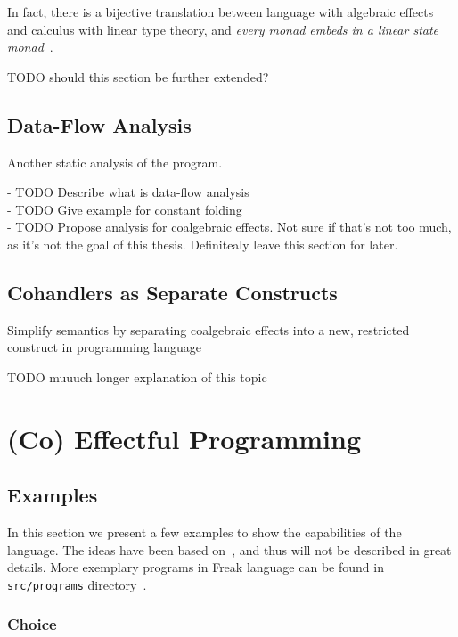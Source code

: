 \documentclass[declaration,shortabstract]{iithesis}
\theoremstyle{definition} \newtheorem{definition}{Definition}[chapter]
\theoremstyle{remark} \newtheorem{remark}[definition]{Observation}
\theoremstyle{plain} \newtheorem{theorem}[definition]{Theorem}
\theoremstyle{plain} \newtheorem{lemma}[definition]{Lemma}
\begin{document}
In fact, there is a bijective translation between language with algebraic effects
and calculus with linear type theory, and \textit{every monad embeds in a linear
state monad}~\cite{linear-usage-of-state}.

\noindent
TODO should this section be further extended?

\section{Data-Flow Analysis}

Another static analysis of the program.

\noindent
- TODO Describe what is data-flow analysis \\
- TODO Give example for constant folding \\
- TODO Propose analysis for coalgebraic effects. Not sure if that's not too much,
as it's not the goal of this thesis. Definitealy leave this section for later.

\section{Cohandlers as Separate Constructs}

Simplify semantics by separating coalgebraic effects into a new, restricted
construct in programming language

\noindent
TODO muuuch longer explanation of this topic

\chapter{(Co) Effectful Programming}\label{chapter:co-effectful-programming} %
\section{Examples}\label{sec:examples}

    In this section we present a few examples to show the capabilities of the language.
    The ideas have been based on~\cite{programming-in-eff}, and thus will not be
    described in great details. More exemplary programs in Freak language can
    be found in \verb!src/programs! directory~\cite{freak}.

    \subsection{Choice}\label{sec:choice-example}
\end{document}
